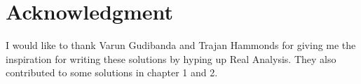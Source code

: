 \documentclass[titlepage]{book}
\begin{document}
\maketitle

\tableofcontents

\chapter*{Acknowledgment}
I would like to thank Varun Gudibanda and Trajan Hammonds for giving
me the inspiration for writing these solutions by hyping up Real Analysis.
They also contributed to some solutions in chapter 1 and 2.






\end{document}
